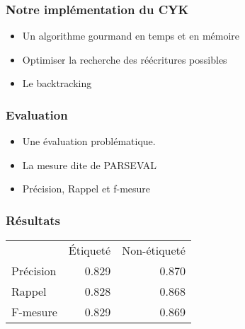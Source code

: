 \documentclass[table]{beamer}
\begin{document}
\begin{frame}
\frametitle{Notre implémentation du CYK}

\begin{itemize}
 \item<1-3>{Un algorithme gourmand en temps et en mémoire}
 \item<2-3>{Optimiser la recherche des réécritures possibles}
 \item<3>{Le backtracking}
\end{itemize}


 
\end{frame}

\begin{frame}
\frametitle{Evaluation}
\begin{itemize}
 \item<1-3> {Une évaluation problématique.}
 \item<2-3> {La mesure dite de PARSEVAL}
 \item<3> {Précision, Rappel et f-mesure}
\end{itemize}

\end{frame}

\begin{frame}
\frametitle{Résultats}
\begin{center}
\begin{tabular}{|l|r|r|}

    & Étiqueté & Non-étiqueté \\
   Précision & 0.829 & 0.870 \\
   Rappel & 0.828 & 0.868 \\
   F-mesure & 0.829 & 0.869 \\
\end{tabular}


\end{center}

\end{frame}
\end{document}
